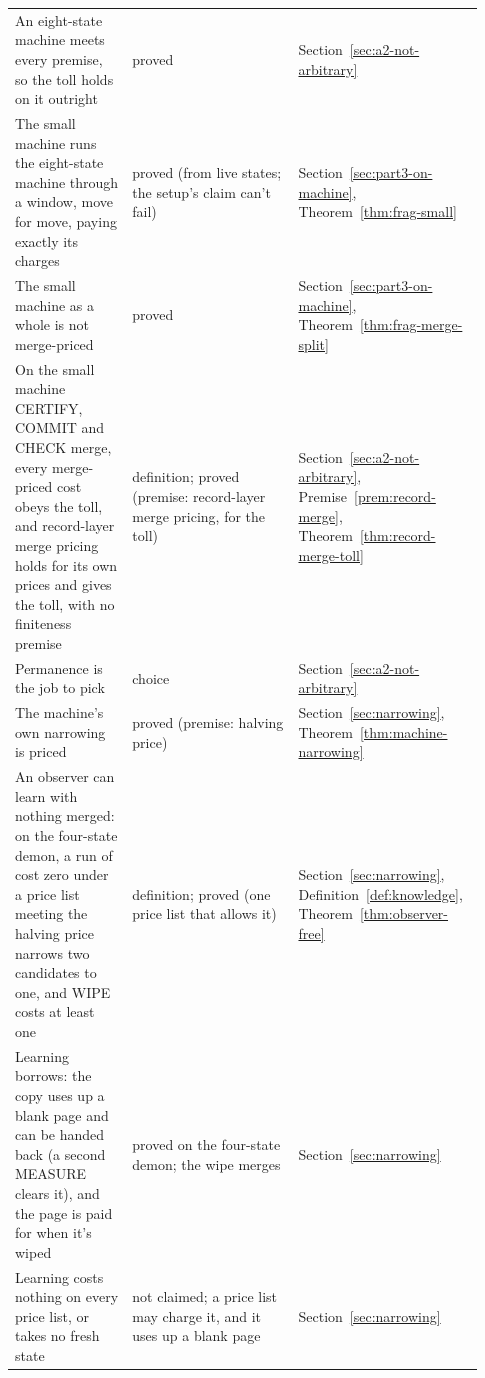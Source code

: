 \documentclass[11pt,twoside]{article}
\theoremstyle{thielethm}
\theoremstyle{thieledef}
\theoremstyle{thieledef}
\theoremstyle{thieledef}
\theoremstyle{thielethm}
\theoremstyle{thieleobs}
\theoremstyle{thielethm}
\begin{document}
\begin{longtable}{@{}>{\raggedright\arraybackslash}p{0.242\linewidth}>{\raggedright\arraybackslash}p{0.344\linewidth}>{\raggedright\arraybackslash}p{0.344\linewidth}@{}}
An eight-state machine meets every premise, so the toll holds on it outright & proved & Section~\ref{sec:a2-not-arbitrary} \\
The small machine runs the eight-state machine through a window, move for move, paying exactly its charges & proved (from live states; the setup's claim can't fail) & Section~\ref{sec:part3-on-machine}, Theorem~\ref{thm:frag-small} \\
The small machine as a whole is not merge-priced & proved & Section~\ref{sec:part3-on-machine}, Theorem~\ref{thm:frag-merge-split} \\
On the small machine CERTIFY, COMMIT and CHECK merge, every merge-priced cost obeys the toll, and record-layer merge pricing holds for its own prices and gives the toll, with no finiteness premise & definition; proved (premise: record-layer merge pricing, for the toll) & Section~\ref{sec:a2-not-arbitrary}, Premise~\ref{prem:record-merge}, Theorem~\ref{thm:record-merge-toll} \\
Permanence is the job to pick & choice & Section~\ref{sec:a2-not-arbitrary} \\
The machine's own narrowing is priced & proved (premise: halving price) & Section~\ref{sec:narrowing}, Theorem~\ref{thm:machine-narrowing} \\
An observer can learn with nothing merged: on the four-state demon, a run of cost zero under a price list meeting the halving price narrows two candidates to one, and WIPE costs at least one & definition; proved (one price list that allows it) & Section~\ref{sec:narrowing}, Definition~\ref{def:knowledge}, Theorem~\ref{thm:observer-free} \\
Learning borrows: the copy uses up a blank page and can be handed back (a second MEASURE clears it), and the page is paid for when it's wiped & proved on the four-state demon; the wipe merges & Section~\ref{sec:narrowing} \\
Learning costs nothing on every price list, or takes no fresh state & not claimed; a price list may charge it, and it uses up a blank page & Section~\ref{sec:narrowing} \\
\end{longtable}
\endgroup
\end{document}

